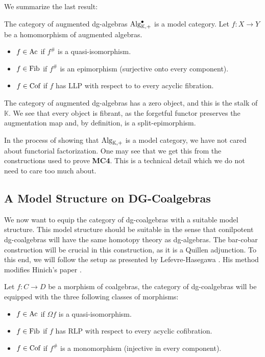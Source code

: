 \documentclass[../thesis.tex]{subfiles}
\begin{document}
            We summarize the last result:

            The category of augmented dg-algebras $\tt{Alg}^\bullet_{\mathbb{K},+}$ is a model category. Let $f: X\rightarrow Y$ be a homomorphism of augmented algebras. 
            \begin{itemize}
                \item $f\in \tt{Ac}$ if $f^\#$ is a quasi-isomorphism.
                \item $f\in \tt{Fib}$ if $f^\#$ is an epimorphism (surjective onto every component).
                \item $f\in \tt{Cof}$ if $f$ has LLP with respect to to every acyclic fibration.
            \end{itemize}
            
            The category of augmented dg-algebras has a zero object, and this is the stalk of $\mathbb{K}$. We see that every object is fibrant, as the forgetful functor preserves the augmentation map and, by definition, is a split-epimorphism.

            \begin{remark}
                In the process of showing that $\tt{Alg}_{\mathbb{K},+}$ is a model category, we have not cared about functorial factorization. One may see that we get this from the constructions used to prove \textbf{MC4}. This is a technical detail which we do not need to care too much about.
            \end{remark}
            
    \subsection{A Model Structure on DG-Coalgebras}

            We now want to equip the category of dg-coalgebras with a suitable model structure. This model structure should be suitable in the sense that conilpotent dg-coalgebras will have the same homotopy theory as dg-algebras. The bar-cobar construction will be crucial in this construction, as it is a Quillen adjunction. To this end, we will follow the setup as presented by Lefevre-Hasegawa \cite{LefevreHasegawa03}. His method modifies Hinich's paper \cite{Hinich01}.

            Let $f: C \rightarrow D$ be a morphism of coalgebras, the category of dg-coalgebras will be equipped with the three following classes of morphisms:
            \begin{itemize}
                \item $f\in \tt{Ac}$ if $\Omega f$ is a quasi-isomorphism.
                \item $f\in \tt{Fib}$ if $f$ has RLP with respect to every acyclic cofibration.
                \item $f\in \tt{Cof}$ if $f^\#$ is a monomorphism (injective in every component).
            \end{itemize}
\end{document}
